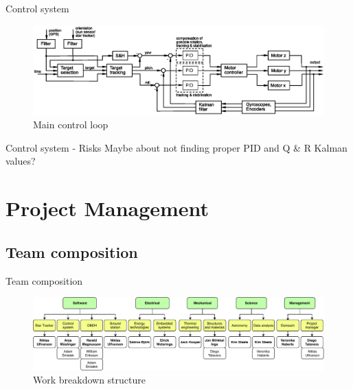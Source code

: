 \documentclass[11pt, aspectratio=169]{beamer}
\begin{document}
\begin{frame}[t]{Control system}
    \begin{figure}
        \includegraphics[width=\linewidth]{figures/images/Control_loop.eps}
        \caption*{Main control loop}
    \end{figure}
\end{frame}

\begin{frame}[c]{Control system - Risks}
    Maybe about not finding proper PID and Q \& R Kalman values?
\end{frame}

\section{Project Management}
\subsection{Team composition}
\begin{frame}{Team composition}
    \begin{figure}
        \includegraphics[width=\linewidth]{images/Team_structure.pdf}
        \caption{Work breakdown structure}
    \end{figure}
\end{frame}

\end{document}
